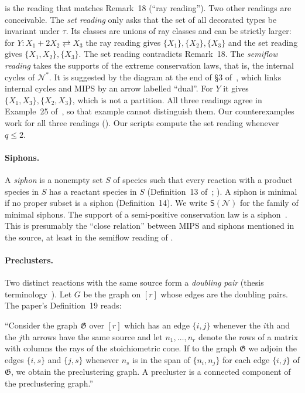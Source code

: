 \documentclass[11pt,a4paper]{report}
\newcommand{\Net}{\mathcal{N}}
\newcommand{\Sip}{\mathsf{S}}
\begin{document}
\begin{remark}\label{rem:readings}
 is the reading that matches Remark~18 (``ray reading''). Two other readings are conceivable.
The \emph{set reading} only asks that the set of all decorated types be invariant under \(\tau\). Its classes are
unions of ray classes and can be strictly larger: for \(Y\colon X_1+2X_2\rightleftarrows X_3\) the ray reading gives
\(\{X_1\},\{X_2\},\{X_3\}\) and the set reading gives \(\{X_1,X_2\},\{X_3\}\). The set reading contradicts Remark~18.
The \emph{semiflow reading} takes the supports of the extreme conservation laws, that is, the internal cycles of
\(\Net^*\). It is suggested by the diagram at the end of §3 of~\autocite{Iosif2026}, which links internal cycles and
MIPS by an arrow labelled ``dual''. For \(Y\) it gives \(\{X_1,X_3\},\{X_2,X_3\}\), which is not a partition. All
three readings agree in Example~25 of~\autocite{Iosif2026}, so that example cannot distinguish them. Our
counterexamples work for all three readings (). Our scripts compute the set reading whenever
\(q\le2\).
\end{remark}

\paragraph{Siphons.} A \emph{siphon} is a nonempty set \(S\) of species such that every reaction with a product
species in \(S\) has a reactant species in \(S\) (Definition~13 of~\autocite{Iosif2026};
\autocite{ShiuSturmfels2010,AngeliDeLeenheerSontag2007}). A siphon is minimal if no proper subset is a siphon
(Definition~14). We write \(\Sip(\Net)\) for the family of minimal siphons. The support of a semi-positive
conservation law is a siphon~\autocite{AngeliDeLeenheerSontag2007}. This is presumably the ``close relation'' between
MIPS and siphons mentioned in the source, at least in the semiflow reading of .

\paragraph{Preclusters.} Two distinct reactions with the same source form a \emph{doubling pair} (thesis
terminology~\autocite{Iosif2019}). Let \(G\) be the graph on \([r]\) whose edges are the doubling pairs. The paper's
Definition~19 reads:

\begin{openquote}
``Consider the graph \(\mathfrak G\) over \([r]\) which has an edge \(\{i,j\}\) whenever the \(i\)th and the \(j\)th
arrows have the same source and let \(n_1,\dots,n_r\) denote the rows of a matrix with columns the rays of the
stoichiometric cone. If to the graph \(\mathfrak G\) we adjoin the edges \(\{i,s\}\) and \(\{j,s\}\) whenever \(n_s\)
is in the span of \(\{n_i,n_j\}\) for each edge \(\{i,j\}\) of \(\mathfrak G\), we obtain the preclustering graph. A
precluster is a connected component of the preclustering graph.''
\end{openquote}
\end{document}
